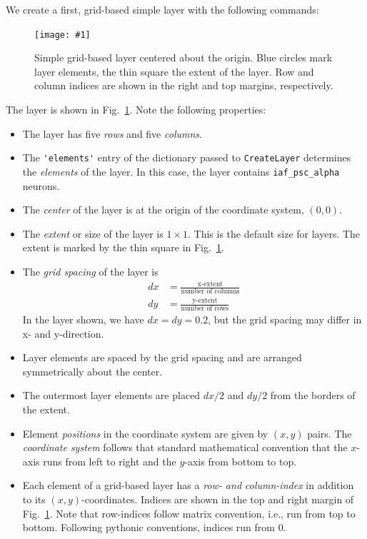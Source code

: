 \documentclass[a4paper,12pt]{report}
\newcommand{\scriptfig}[4]{%
\begin{figure}
\centerline{\texttt{[image: \#1]}}
\caption[#3]{#4}
\label{fig:#1}
\end{figure}%
}
\begin{document}
We create a first, grid-based simple layer 
with the following commands:
%

\scriptfig{layer1}{0.5}{Simple grid-based layer}%
{Simple grid-based layer centered about the origin. Blue circles mark
layer elements, the thin square the extent of the layer. Row and
column indices are shown in the right and top margins, respectively.}
%
The layer is shown in Fig.~\ref{fig:layer1}. Note the following
properties:
\begin{itemize}
\item The layer has five \emph{rows} and five
  \emph{columns}.
\item The \lstinline!'elements'! entry of the dictionary passed to
  \lstinline!CreateLayer! determines the
  \emph{elements} of the layer. In this case, the layer
  contains \lstinline!iaf_psc_alpha! neurons.
\item The \emph{center} of the layer is at the origin of
  the coordinate system, $(0,0)$. 
\item The \emph{extent} or size of the layer is $1\times
  1$. This is the default size for layers. The extent is marked by the
  thin square in Fig.~\ref{fig:layer1}.
\item The \emph{grid spacing} of the layer is 
\begin{equation}\label{eq:dx_dy_extent}\begin{split}
dx &= \frac{\text{x-extent}}{\text{number of columns}} \\
dy &= \frac{\text{y-extent}}{\text{number of rows}} 
\end{split}\end{equation}
In the layer shown, we have $dx=dy=0.2$, but the grid spacing may differ
in x- and y-direction.
\item Layer elements are spaced by the grid spacing and are arranged
  symmetrically about the center. 
\item The outermost layer elements are placed $dx/2$ and $dy/2$ from
  the borders of the extent.
\item Element \emph{positions} in the coordinate
  system are given by $(x,y)$ pairs. The \emph{coordinate
    system} follows that standard
  mathematical convention that the $x$-axis runs from left to right
  and the $y$-axis from bottom to top.
\item Each element of a grid-based layer has a \emph{row- and
    column-index}  in addition to its
  $(x,y)$-coordinates. Indices are shown in the top and right margin
  of Fig.~\ref{fig:layer1}. Note that row-indices follow matrix
  convention, i.e., run from top to bottom. Following pythonic
  conventions, indices run from 0. 
\end{itemize}
\end{document}
